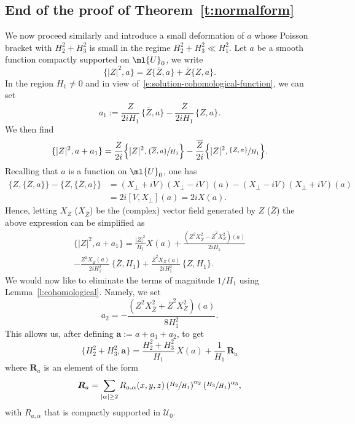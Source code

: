 \documentclass[JEP,XML,SOM,Unicode, NoEqCountersInSection,published]{cedram}
\theoremstyle{plain}
\theoremstyle{definition}
\theoremstyle{remark}
\begin{document}
\subsection{End of the proof of Theorem~\ref{t:normalform}} We now proceed similarly and introduce a small deformation of $a$ whose Poisson bracket with $H_2^2+H_3^2$ is small in the regime $H_2^2+H_3^2\ll H_1^2$. Let $a$ be a smooth function compactly supported on $\ml{U}_0$, we write
\[
\{|Z|^2,a\}=Z\{\overline{Z},a\}+\overline{Z}\{Z,a\}.
\]
In the region $H_1\neq 0$ and in view of~\eqref{e:solution-cohomological-function}, we can set
\[
a_1:=\frac{Z}{2iH_1}\,\{\overline{Z},a\}-\frac{\overline{Z}}{2iH_1}\,\{Z,a\}.
\]
We then find
\[
\{|Z|^2,a + a_1\}=\frac{Z}{2i}\Bigl\{|Z|^2,\sfrac{\{\overline{Z},a\}}{H_1}\Bigr\}-\frac{\overline{Z}}{2i}\Bigl\{|Z|^2,\sfrac{\{Z,a\}}{H_1}\Bigr\}.
\]
Recalling that $a$ is a function on $\ml{U}_0$, one has
\begin{align*}
\{Z,\{\overline{Z},a\}\}-\{Z,\{\overline{Z},a\}\}&=(X_\perp+iV)(X_\perp-iV)(a)-(X_\perp-iV)(X_\perp+iV)(a)\\
&=2i[V,X_\perp](a)=2iX(a).
\end{align*}
Hence, letting $X_{Z}$ (\resp $X_{\overline{Z}}$) be the (complex) vector field generated by $Z$ (\resp $\overline{Z}$) the above expression can be simplified as
\begin{multline*}
\{|Z|^2,a+a_1\}=\frac{|Z|^2}{H_1}X(a)+\frac{(Z^2X_{\overline{Z}}^2-\overline{Z}^2X_Z^2)(a)}{2iH_1}\\[-5pt]
-\frac{Z^2X_{\overline{Z}}(a)}{2iH_1^2}\,\{\overline{Z},H_1\}+\frac{\overline{Z}^2X_Z(a)}{2iH_1^2}\,\{Z,H_1\}.
\end{multline*}
We would now like to eliminate the terms of magnitude $1/H_1$ using Lemma~\ref{l:cohomological}. Namely, we set
\[
a_2=-\frac{(Z^2X_{\overline{Z}}^2+\overline{Z}^2X_Z^2)(a)}{8H_1^2}.
\]
This allows us, after defining $\boldsymbol{a}:=a+a_1 + a_2$, to get
\begin{equation}\label{e:poisson-bracket-a-normal-form}
\{H_2^2+H_3^2,\boldsymbol{a}\}=\frac{H_2^2+H_3^2}{H_1}\,X(a)+\frac{1}{H_1}\,\boldsymbol{R}_a
\end{equation}
where $\boldsymbol{R}_a$ is an element of the form
\[
\boldsymbol{R}_a=\sum_{|\alpha|\geq 2}R_{a,\alpha}(x,y,z)\left(\sfrac{H_2}{H_1}\right)^{\alpha_2}(\sfrac{H_3}{H_1})^{\alpha_3},
\]
with $R_{a,\alpha}$ that is compactly supported in $\mathcal{U}_0$.
\end{document}
